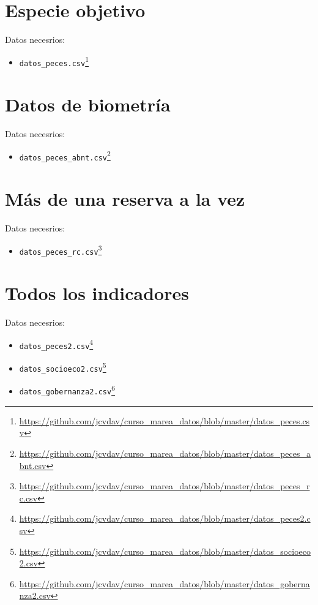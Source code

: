 \documentclass[]{krantz}
\providecommand{\tightlist}{%
  \setlength{\itemsep}{0pt}\setlength{\parskip}{0pt}}
\renewcommand{\href}[2]{#2\footnote{\url{#1}}}
\begin{document}
\hypertarget{especie-objetivo}{%
\section{Especie objetivo}\label{especie-objetivo}}

Datos necesrios:

\begin{itemize}
\tightlist
\item
  \href{https://github.com/jcvdav/curso_marea_datos/blob/master/datos_peces.csv}{\texttt{datos\_peces.csv}}
\end{itemize}

\hypertarget{datos-de-biometria}{%
\section{Datos de biometría}\label{datos-de-biometria}}

Datos necesrios:

\begin{itemize}
\tightlist
\item
  \href{https://github.com/jcvdav/curso_marea_datos/blob/master/datos_peces_abnt.csv}{\texttt{datos\_peces\_abnt.csv}}
\end{itemize}

\hypertarget{mas-de-una-reserva-a-la-vez}{%
\section{Más de una reserva a la
vez}\label{mas-de-una-reserva-a-la-vez}}

Datos necesrios:

\begin{itemize}
\tightlist
\item
  \href{https://github.com/jcvdav/curso_marea_datos/blob/master/datos_peces_rc.csv}{\texttt{datos\_peces\_rc.csv}}
\end{itemize}

\hypertarget{todos-los-indicadores}{%
\section{Todos los indicadores}\label{todos-los-indicadores}}

Datos necesrios:

\begin{itemize}
\tightlist
\item
  \href{https://github.com/jcvdav/curso_marea_datos/blob/master/datos_peces2.csv}{\texttt{datos\_peces2.csv}}
\item
  \href{https://github.com/jcvdav/curso_marea_datos/blob/master/datos_socioeco2.csv}{\texttt{datos\_socioeco2.csv}}
\item
  \href{https://github.com/jcvdav/curso_marea_datos/blob/master/datos_gobernanza2.csv}{\texttt{datos\_gobernanza2.csv}}
\end{itemize}
\end{document}
